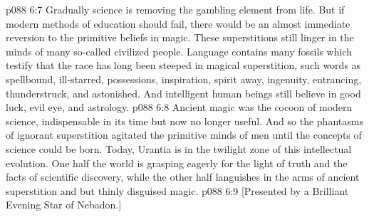 \vs p088 6:7 Gradually science is removing the gambling element from life. But if modern methods of education should fail, there would be an almost immediate reversion to the primitive beliefs in magic. These superstitions still linger in the minds of many so\hyp{}called civilized people. Language contains many fossils which testify that the race has long been steeped in magical superstition, such words as spellbound, ill\hyp{}starred, possessions, inspiration, spirit away, ingenuity, entrancing, thunderstruck, and astonished. And intelligent human beings still believe in good luck, evil eye, and astrology.
\vs p088 6:8 Ancient magic was the cocoon of modern science, indispensable in its time but now no longer useful. And so the phantasms of ignorant superstition agitated the primitive minds of men until the concepts of science could be born. Today, Urantia is in the twilight zone of this intellectual evolution. One half the world is grasping eagerly for the light of truth and the facts of scientific discovery, while the other half languishes in the arms of ancient superstition and but thinly disguised magic.
\vsetoff
\vs p088 6:9 [Presented by a Brilliant Evening Star of Nebadon.]
\quizlink
